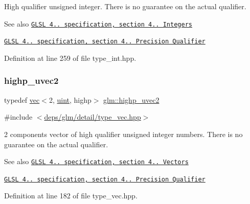 High qualifier unsigned integer. There is no guarantee on the actual qualifier.

\begin{DoxySeeAlso}{See also}
\href{http://www.opengl.org/registry/doc/GLSLangSpec.4.20.8.pdf}{\tt G\+L\+SL 4.. specification, section 4.. Integers} 

\href{http://www.opengl.org/registry/doc/GLSLangSpec.4.20.8.pdf}{\tt G\+L\+SL 4.. specification, section 4.. Precision Qualifier} 
\end{DoxySeeAlso}


Definition at line 259 of file type\+\_\+int.\+hpp.

\mbox{\label{group__core__precision_ga34aca1cdf2130b1179fd7c5554bc1883}} 
\subsubsection{\texorpdfstring{highp\+\_\+uvec2}{highp\_uvec2}}
{\footnotesize\ttfamily typedef \hyperlink{structglm_1_1vec}{vec}$<$2, \hyperlink{group__core__precision_ga4fd29415871152bfb5abd588334147c8}{uint}, highp$>$ \hyperlink{group__core__precision_ga34aca1cdf2130b1179fd7c5554bc1883}{glm\+::highp\+\_\+uvec2}}



{\ttfamily \#include $<$\hyperlink{type__vec_8hpp}{deps/glm/detail/type\+\_\+vec.\+hpp}$>$}

2 components vector of high qualifier unsigned integer numbers. There is no guarantee on the actual qualifier.

\begin{DoxySeeAlso}{See also}
\href{http://www.opengl.org/registry/doc/GLSLangSpec.4.20.8.pdf}{\tt G\+L\+SL 4.. specification, section 4.. Vectors} 

\href{http://www.opengl.org/registry/doc/GLSLangSpec.4.20.8.pdf}{\tt G\+L\+SL 4.. specification, section 4.. Precision Qualifier} 
\end{DoxySeeAlso}


Definition at line 182 of file type\+\_\+vec.\+hpp.

\mbox{\label{group__core__precision_ga2e16953ad75ce0c6d7faa921ca006ce5}} 

